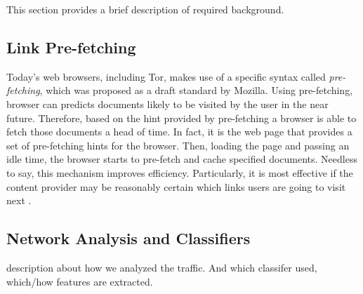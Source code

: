 
This section provides a brief description of required background.

\subsection{Link Pre-fetching}
Today's web browsers, including Tor, makes use of a specific syntax called \emph{pre-fetching}, which was proposed as a draft standard by Mozilla. Using pre-fetching, browser can predicts documents likely to be visited by the user in the near future. Therefore, based on the hint provided by pre-fetching a browser is able to fetch those documents a head of time. In fact, it is the web page that provides a set of pre-fetching hints for the browser. Then, loading the page and passing an idle time, the browser starts to pre-fetch and cache specified documents. Needless to say, this mechanism improves efficiency. Particularly, it is most effective if the content provider may be reasonably certain which links users are going to visit next \cite{wikiPreF}.

\subsection{Network Analysis and Classifiers}
description about how we analyzed the traffic. And which classifer used, which/how features are extracted.
